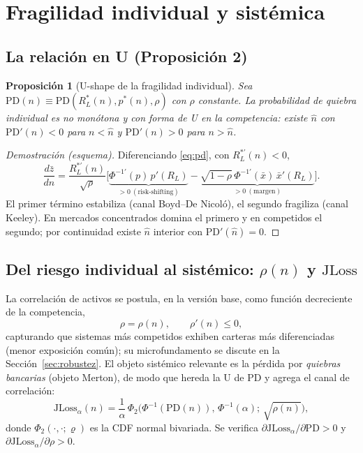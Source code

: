 \documentclass[11pt]{article}
\theoremstyle{plain}
\newtheorem{proposition}{Proposición}
\theoremstyle{definition}
\theoremstyle{remark}
\newcommand{\JLoss}{\mathrm{JLoss}}
\newcommand{\PD}{\mathrm{PD}}
\newcommand{\1}{\mathbf{1}}
\begin{document}
\section{Fragilidad individual y sistémica}\label{sec:sistemico}

\subsection{La relación en U (Proposición 2)}
\begin{proposition}[U-shape de la fragilidad individual]\label{prop:U}
Sea $\PD(n)\equiv\PD(R_L^*(n),p^*(n),\rho)$ con $\rho$ constante. La probabilidad de quiebra individual es no monótona y con forma de U en la competencia: existe $\hat n$ con $\PD'(n)<0$ para $n<\hat n$ y $\PD'(n)>0$ para $n>\hat n$.
\end{proposition}
\begin{proof}[Demostración (esquema)]
Diferenciando \eqref{eq:pd}, con $R_L^{*\prime}(n)<0$,
\[
\frac{d\bar z}{dn}=\frac{R_L^{*\prime}(n)}{\sqrt{\rho}}\Big[\underbrace{\Phi^{-1\prime}(p)\,p'(R_L)}_{>0\ (\text{risk-shifting})}-\underbrace{\sqrt{1-\rho}\,\Phi^{-1\prime}(\bar x)\,\bar x'(R_L)}_{>0\ (\text{margen})}\Big].
\]
El primer término estabiliza (canal Boyd--De Nicoló), el segundo fragiliza (canal Keeley). En mercados concentrados domina el primero y en competidos el segundo; por continuidad existe $\hat n$ interior con $\PD'(\hat n)=0$.
\end{proof}

\subsection{Del riesgo individual al sistémico: $\rho(n)$ y $\JLoss$}
La correlación de activos se postula, en la versión base, como función decreciente de la competencia,
\begin{equation}
\rho=\rho(n),\qquad \rho'(n)\le 0,
\label{eq:rho}
\end{equation}
capturando que sistemas más competidos exhiben carteras más diferenciadas (menor exposición común); su microfundamento se discute en la Sección~\ref{sec:robustez}. El objeto sistémico relevante es la pérdida por \textit{quiebras bancarias} (objeto Merton), de modo que hereda la U de $\PD$ y agrega el canal de correlación:
\begin{equation}
\JLoss_\alpha(n)=\frac{1}{\alpha}\,\Phi_2\!\big(\Phi^{-1}(\PD(n)),\,\Phi^{-1}(\alpha);\,\sqrt{\rho(n)}\big),
\label{eq:jloss}
\end{equation}
donde $\Phi_2(\cdot,\cdot;\varrho)$ es la CDF normal bivariada. Se verifica $\partial\JLoss_\alpha/\partial\PD>0$ y $\partial\JLoss_\alpha/\partial\rho>0$.
\end{document}
